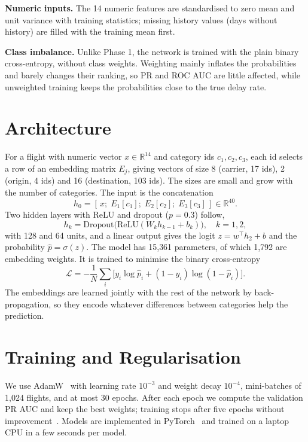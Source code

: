 \documentclass[conference]{IEEEtran}
\begin{document}
\textbf{Numeric inputs.} The 14 numeric features are standardised to zero mean and unit variance with training
statistics; missing history values (days without history) are filled with the training mean first.

\textbf{Class imbalance.} Unlike Phase 1, the network is trained with the plain binary cross-entropy, without class
weights. Weighting mainly inflates the probabilities and barely changes their ranking, so PR and ROC AUC are
little affected, while unweighted training keeps the probabilities close to the true delay rate.

\section{Architecture}
For a flight with numeric vector $x \in \mathbb{R}^{14}$ and category ids $c_1, c_2, c_3$, each id selects a row of an
embedding matrix $E_j$, giving vectors of size 8 (carrier, 17 ids), 2 (origin, 4 ids) and 16 (destination, 103
ids). The sizes are small and grow with the number of categories. The input is the concatenation
\begin{equation}
h_0 = [\,x;\; E_1[c_1];\; E_2[c_2];\; E_3[c_3]\,] \in \mathbb{R}^{40}.
\end{equation}
Two hidden layers with ReLU and dropout ($p=0.3$) follow,
\begin{equation}
h_k = \mathrm{Dropout}\big(\mathrm{ReLU}(W_k h_{k-1} + b_k)\big), \quad k = 1, 2,
\end{equation}
with 128 and 64 units, and a linear output gives the logit $z = w^\top h_2 + b$ and the probability
$\hat p = \sigma(z)$. The model has 15{,}361 parameters, of which 1{,}792 are embedding weights. It is trained to
minimise the binary cross-entropy
\begin{equation}
\mathcal{L} = -\frac{1}{N}\sum_{i} \big[y_i \log \hat p_i + (1-y_i)\log(1-\hat p_i)\big].
\end{equation}
The embeddings are learned jointly with the rest of the network by back-propagation, so they encode whatever
differences between categories help the prediction.

\section{Training and Regularisation}
We use AdamW~\cite{loshchilov2019decoupled} with learning rate $10^{-3}$ and weight decay $10^{-4}$, mini-batches of
1{,}024 flights, and at most 30 epochs. After each epoch we compute the validation PR AUC and keep the best
weights; training stops after five epochs without improvement~\cite{prechelt1998early}. Models are implemented in
PyTorch~\cite{paszke2019pytorch} and trained on a laptop CPU in a few seconds per model.
\end{document}
